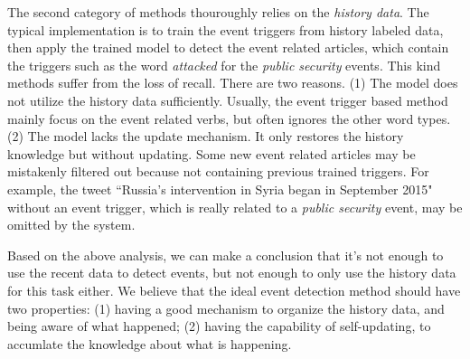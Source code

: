 \documentclass[conference,compsoc]{IEEEtran}
\begin{document}
The second category of methods thouroughly relies on the \textit{history data}. 
The typical implementation is to train the event triggers\cite{Li2013JointEE}\cite{Nguyen2015EventDA} from history labeled data, then apply the trained model to detect the event related articles, which contain the triggers such as the word \textit{attacked} for the \textit{public security} events. 
This kind methods suffer from the loss of recall. 
There are two reasons. 
(1) The model does not utilize the history data sufficiently. 
Usually, the event trigger based method mainly focus on the event related verbs, but often ignores the other word types.
(2) The model lacks the update mechanism. 
It only restores the history knowledge but without updating. 
Some new event related articles may be mistakenly filtered out because not containing previous trained triggers. 
For example, the tweet ``Russia's intervention in Syria began in September 2015" without an event trigger, which is really related to a \textit{public security} event, may be omitted by the system. 

Based on the above analysis, we can make a conclusion that it's not enough to use the recent data to detect events, but not enough to only use the history data for this task either.
We believe that the ideal event detection method should have two properties: (1) having a good mechanism to organize the history data, and being aware of what happened; (2) having the capability of self-updating, to accumlate the knowledge about what is happening.

\end{document}
